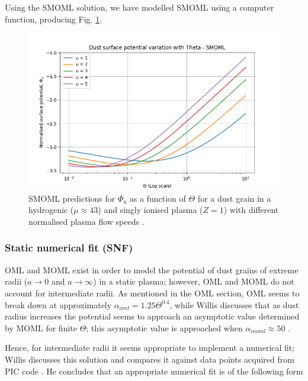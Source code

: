 \documentclass[journal]{Imperial_lab_report}
\begin{document}
Using the SMOML solution, we have modelled SMOML using a computer function, producing Fig. \ref{SMOMLgraph}.

\begin{figure}[H]
\centering
\includegraphics[width=\linewidth]{Output/SMOMLgraph.jpeg}
\caption{SMOML predictions for $\Phi_a$ as a function of $\Theta$ for a dust grain in a hydrogenic ($\mu \approx 43$) and singly ionised plasma ($Z=1$) with different normalised plasma flow speeds \cite{Thomas}.}
\label{SMOMLgraph} 
\end{figure}

\subsubsection{Static numerical fit (SNF)}

\medskip

OML and MOML exist in order to model the potential of dust grains of extreme radii ($ a \xrightarrow{} 0$ and $a \xrightarrow{} \infty$) in a static plasma; however, OML and MOML do not account for intermediate radii. As mentioned in the OML section, OML seems to break down at approximately $\alpha_{oml} = 1.25\Theta^{0.4}$, while Willis discusses that as dust radius increases the potential seems to approach an asymptotic value determined by MOML for finite $\Theta$; this asymptotic value is approached when $\alpha_{moml} \approx 50$ \cite{Willis}.

\smallskip

Hence, for intermediate radii it seems appropriate to implement a numerical fit; Willis discusses this solution and compares it against data points acquired from PIC code \cite{Willis}. He concludes that an appropriate numerical fit is of the following form
\end{document}
